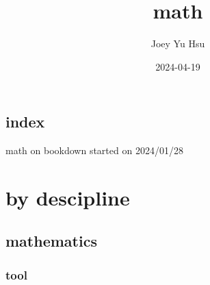 \documentclass[
]{book}
\title{math}
\author{Joey Yu Hsu}
\date{2024-04-19}
\theoremstyle{definition}
\theoremstyle{definition}
\theoremstyle{definition}
\theoremstyle{definition}
\theoremstyle{remark}
\begin{document}
\maketitle

{
\hypersetup{linkcolor=}
\setcounter{tocdepth}{4}
\tableofcontents
}
\chapter*{index}\label{index}

math on bookdown started on 2024/01/28

\part{by descipline}\label{part-by-descipline}

\chapter{mathematics}\label{mathematics}

\section{tool}\label{tool}
\end{document}
